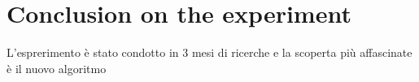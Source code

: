 

\section{Conclusion on the experiment}\label{sec:conclution}
L'esprerimento è stato condotto in 3 mesi di ricerche e la scoperta più affascinate è il nuovo algoritmo
\hfill\break



